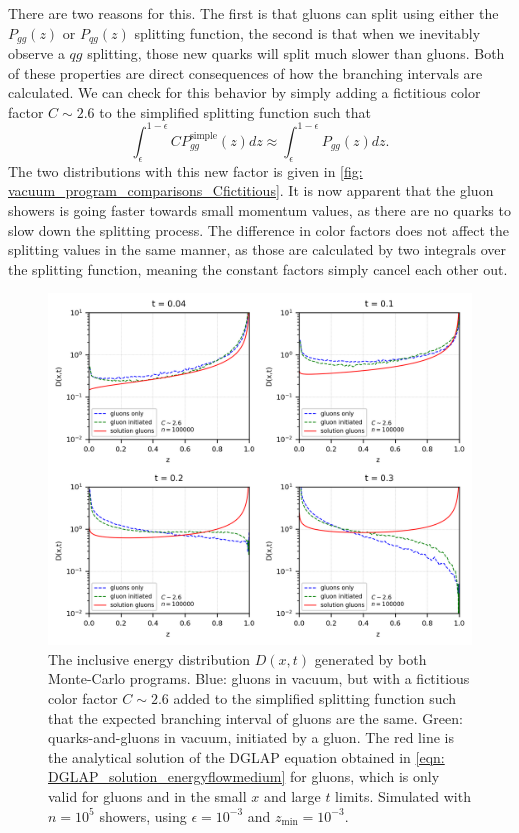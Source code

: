 \documentclass[main.tex]{subfiles}
\begin{document}
There are two reasons for this. The first is that gluons can split using either the \(P_{gg}(z)\) or \(P_{qg}(z)\) splitting function, the second is that when we inevitably observe a \(qg\) splitting, those new quarks will split much slower than gluons. Both of these properties are direct consequences of how the branching intervals are calculated. We can check for this behavior by simply adding a fictitious color factor \(C\sim 2.6\) to the simplified splitting function such that
\begin{equation}
    \int_\epsilon^{1-\epsilon} C P_{gg}^{\text{simple}}(z) dz \approx \int_\epsilon^{1-\epsilon} P_{gg}(z) dz.
\end{equation}
The two distributions with this new factor is given in \autoref{fig: vacuum_program_comparisons_Cfictitious}. It is now apparent that the gluon showers is going faster towards small momentum values, as there are no quarks to slow down the splitting process. The difference in color factors does not affect the splitting values in the same manner, as those are calculated by two integrals over the splitting function, meaning the constant factors simply cancel each other out.
\begin{figure}[hbt]
    \centering
    \includegraphics[width=13cm]{pictures/plots/distributions/program_comparison/comparison_vacuum_programs_100k_lin_cfact.png}
    \caption{The inclusive energy distribution \(D(x,t)\) generated by both Monte-Carlo programs. Blue: gluons in vacuum, but with a fictitious color factor \(C\sim2.6\) added to the simplified splitting function such that the expected branching interval of gluons are the same. Green: quarks-and-gluons in vacuum, initiated by a gluon. The red line is the analytical solution of the DGLAP equation obtained in \autoref{eqn: DGLAP_solution_energyflowmedium} for gluons, which is only valid for gluons and in the small \(x\) and large \(t\) limits. Simulated with \(n = 10^5\) showers, using \(\epsilon=10^{-3}\) and \(z_{\text{min}}=10^{-3}\).}
    \label{fig: vacuum_program_comparisons_Cfictitious}
\end{figure}
\end{document}
